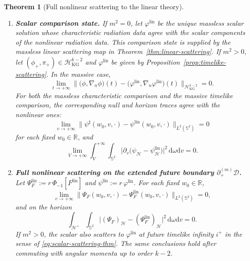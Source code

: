 \documentclass[11pt]{article}
\numberwithin{equation}{section}
\theoremstyle{plain}
\newtheorem{theorem}{Theorem}[section]
\theoremstyle{definition}
\theoremstyle{remark}
\newcommand{\D}{\mathcal{D}}
\newcommand{\dd}{\mathrm{d}}
\begin{document}
\begin{theorem}[Full nonlinear scattering to the linear theory]
\begin{enumerate}
\item[(iii)] \textbf{Scalar comparison state.}
If $m^{2}=0$, let $\varphi^{\mathrm{lin}}$ be the unique massless scalar solution whose characteristic radiation data agree with the scalar components of the nonlinear radiation data.  This comparison state is supplied by the massless linear scattering map in Theorem~\ref{thm:linear-scattering}.
If $m^{2}>0$, let $(\phi_{+},\pi_{+})\in \mathcal H_{\mathrm{KG}}^{k-2}$ and $\varphi^{\mathrm{lin}}$ be given by Proposition~\ref{prop:timelike-scattering}.  In the massive case,
\begin{equation}\label{eq:scalar-scattering-thm}
\lim_{t\to+\infty}
\bigl\|\bigl(\phi,\nabla_{n}\phi\bigr)(t)-\bigl(\varphi^{\mathrm{lin}},\nabla_{n}\varphi^{\mathrm{lin}}\bigr)(t)\bigr\|_{\mathcal H_{\mathrm{KG}}^{k-2}}=0.
\end{equation}
For both the massless characteristic comparison and the massive timelike comparison, the corresponding null and horizon traces agree with the nonlinear ones:
\begin{equation}\label{eq:scalar-null-scattering}
\lim_{v\to+\infty}
\|\psi^\sharp(w_0,v,\cdot)-\psi^{\mathrm{lin}}(w_0,v,\cdot)\|_{L^2(\mathbb S^2)}=0
\end{equation}
for each fixed $w_0\in\mathbb R$, and
\begin{equation}\label{eq:scalar-horizon-tail}
\lim_{V\to+\infty}
\int_{V}^{+\infty}\!\!\int_{\mathbb S^2}
\bigl|\partial_v\bigl(\psi_{\mathcal H}-\psi_{\mathcal H}^{\mathrm{lin}}\bigr)\bigr|^{2}\,\dd\omega\dd v
=0.
\end{equation}

\item[(iv)] \textbf{Full nonlinear scattering on the extended future boundary $\partial_{+}^{(m)}\D$.}
Let $\Psi_F^{\mathrm{lin}}:=r\,\Phi_{-1}[F^{\mathrm{lin}}]$ and $\psi^{\mathrm{lin}}:=r\,\varphi^{\mathrm{lin}}$.
For each fixed $w_0\in\mathbb R$,
\begin{equation}
\lim_{v\to+\infty}
\|\Psi_F(w_0,v,\cdot)-\Psi_F^{\mathrm{lin}}(w_0,v,\cdot)\|_{L^2(\mathbb S^2)}=0,
\end{equation}
and on the horizon
\begin{equation}
\int_{\mathcal H^{+}}\!\!\int_{\mathbb S^2}
\bigl|(\Psi_F)_{\mathcal H}-(\Psi_F^{\mathrm{lin}})_{\mathcal H}\bigr|^{2}\,\dd\omega\dd v =0.
\end{equation}
If $m^{2}>0$, the scalar also scatters to $\varphi^{\mathrm{lin}}$ at future timelike infinity $i^{+}$ in the sense of \eqref{eq:scalar-scattering-thm}.
The same conclusions hold after commuting with angular momenta up to order $k-2$.
\end{enumerate}
\end{theorem}
\end{document}
